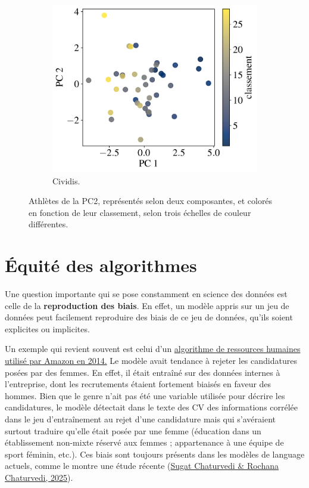 \begin{figure}[h]
  \begin{subfigure}[t]{0.30\textwidth}
    \centering
    \includegraphics[width=\textwidth]{figures/pratiques/pca_plot_cividis}
    \caption{Cividis.}
    \label{fig:pca_plot_cividis}
  \end{subfigure} 
  \caption{Athlètes de la PC2, représentés selon deux composantes, et colorés
    en fonction de leur classement, selon trois échelles de couleur
    différentes.}
  \label{fig:pca_plot}
\end{figure}

\section{Équité des algorithmes}
Une question importante qui se pose constamment en science des données est
celle de la \textbf{reproduction des biais}. En effet, un modèle appris sur un
jeu de données peut facilement reproduire des biais de ce jeu de données,
qu'ils soient explicites ou implicites.

Un exemple qui revient souvent est celui d'un \href{https://www.numerama.com/tech/426774-amazon-a-du-desactiver-une-ia-qui-discriminait-les-candidatures-de-femmes-a-lembauche.html}{algorithme de ressources humaines
utilisé par Amazon en 2014.} Le modèle avait tendance à rejeter les candidatures posées
par des femmes. En effet, il était entraîné sur des données internes à
l'entreprise, dont les recrutements étaient fortement biaisés en faveur des
hommes. Bien que le genre n'ait pas été une variable utilisée pour décrire les
candidatures, le modèle détectait dans le texte des CV des informations
corrélée dans le jeu d'entraînement au rejet d'une candidature mais qui
s'avéraient surtout traduire qu'elle était posée par une femme (éducation dans
un établissement non-mixte réservé aux femmes ; appartenance à une équipe de
sport féminin, etc.). Ces biais sont toujours présents dans les modèles de
language actuels, comme le montre une étude récente (\href{https://arxiv.org/abs/2504.21400}{Sugat Chaturvedi \& Rochana Chaturvedi, 2025}).

